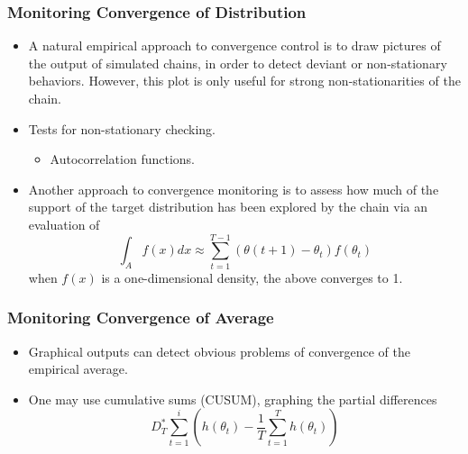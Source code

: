 \documentclass[10pt]{beamer}
\begin{document}
\begin{frame}
  \frametitle{Monitoring Convergence of Distribution}

  \begin{itemize}
  \item A natural empirical approach to convergence control is to draw pictures
    of the output of simulated chains, in order to detect deviant or
    non-stationary behaviors. However, this plot is only useful for strong
    non-stationarities of the chain.

  \item Tests for non-stationary checking.

    \begin{itemize}
    \item Autocorrelation functions.
    \end{itemize}

  \item Another approach to convergence monitoring is to assess how much of the
    support of the target distribution has been explored by the chain via an
    evaluation of
    \begin{equation*}
      \int_A f(x) dx \approx \sum_{t=1}^{T-1}(\theta(t+1)-\theta_t) f(\theta_t)
    \end{equation*}
    when $f(x)$ is a one-dimensional density, the above converges to 1.

  \end{itemize}

\end{frame}


\begin{frame}
  \frametitle{Monitoring Convergence of Average}

  \begin{itemize}
  \item Graphical outputs can detect obvious problems of convergence of the
    empirical average.

  \item One may use cumulative sums (CUSUM), graphing the partial differences
    \begin{equation*}
      D_T^* \sum _{t=1}^i (h(\theta_t)-\frac{1}{T}\sum_{t=1}^Th(\theta_t))
    \end{equation*}

  \end{itemize}

\end{frame}
\end{document}

